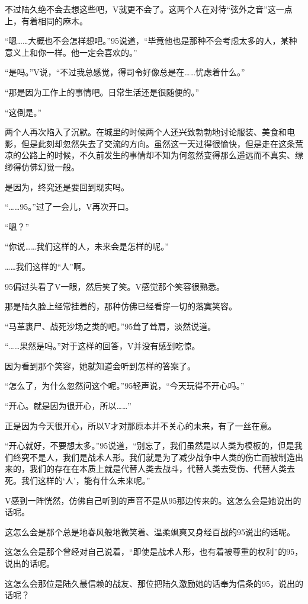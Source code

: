 不过陆久绝不会去想这些吧，V就更不会了。这两个人在对待“弦外之音”这一点上，有着相同的麻木。

“嗯……大概也不会怎样想吧。”95说道，“毕竟他也是那种不会考虑太多的人，某种意义上和你一样。他一定会喜欢的。”

“是吗。”V说，“不过我总感觉，得司令好像总是在……忧虑着什么。”

“那是因为工作上的事情吧。日常生活还是很随便的。”

“这倒是。”

两个人再次陷入了沉默。在城里的时候两个人还兴致勃勃地讨论服装、美食和电影，但是此刻却忽然失去了交流的方向。虽然这一天过得很愉快，但是走在这条荒凉的公路上的时候，不久前发生的事情却不知为何忽然变得那么遥远而不真实、缥缈得仿佛幻觉一般。

是因为，终究还是要回到现实吗。

“……95。”过了一会儿，V再次开口。

“嗯？”

“你说……我们这样的人，未来会是怎样的呢。”

……我们这样的“人”啊。

95偏过头看了V一眼，然后笑了笑。V感觉那个笑容很熟悉。

那是陆久脸上经常挂着的，那种仿佛已经看穿一切的落寞笑容。

“马革裹尸、战死沙场之类的吧。”95耸了耸肩，淡然说道。

“……果然是吗。”对于这样的回答，V并没有感到吃惊。

因为看到那个笑容，她就知道会听到怎样的答案了。

“怎么了，为什么忽然问这个呢。”95轻声说，“今天玩得不开心吗。”

“开心。就是因为很开心，所以……”

正是因为今天很开心，所以V才对那原本并不关心的未来，有了一丝在意。

“开心就好，不要想太多。”95说道，“别忘了，我们虽然是以人类为模板的，但是我们终究不是人，我们是战术人形。我们就是为了减少战争中人类的伤亡而被制造出来的，我们的存在在本质上就是代替人类去战斗，代替人类去受伤、代替人类去死。我们这样的‘人’，能有什么未来呢。”

V感到一阵恍然，仿佛自己听到的声音不是从95那边传来的。这怎么会是她说出的话呢。

这怎么会是那个总是地春风般地微笑着、温柔飒爽又身经百战的95说出的话呢。

这怎么会是那个曾经对自己说着，“即使是战术人形，也有着被尊重的权利”的95，说出的话呢。

这怎么会那位是陆久最信赖的战友、那位把陆久激励她的话奉为信条的95，说出的话呢？

